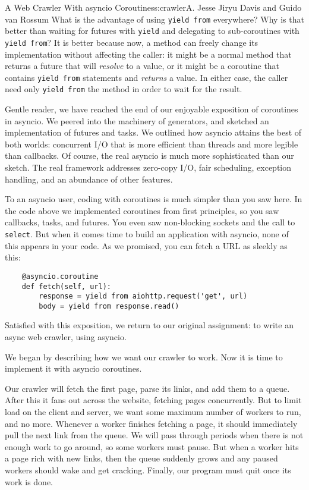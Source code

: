 \begin{aosachapter}{A Web Crawler With asyncio Coroutines}{s:crawler}{A. Jesse Jiryu Davis and Guido van Rossum}
What is the advantage of using \texttt{yield from} everywhere? Why is
that better than waiting for futures with \texttt{yield} and delegating
to sub-coroutines with \texttt{yield from}? It is better because now, a
method can freely change its implementation without affecting the
caller: it might be a normal method that returns a future that will
\emph{resolve} to a value, or it might be a coroutine that contains
\texttt{yield from} statements and \emph{returns} a value. In either
case, the caller need only \texttt{yield from} the method in order to
wait for the result.

Gentle reader, we have reached the end of our enjoyable exposition of
coroutines in asyncio. We peered into the machinery of generators, and
sketched an implementation of futures and tasks. We outlined how asyncio
attains the best of both worlds: concurrent I/O that is more efficient
than threads and more legible than callbacks. Of course, the real
asyncio is much more sophisticated than our sketch. The real framework
addresses zero-copy I/O, fair scheduling, exception handling, and an
abundance of other features.

To an asyncio user, coding with coroutines is much simpler than you saw
here. In the code above we implemented coroutines from first principles,
so you saw callbacks, tasks, and futures. You even saw non-blocking
sockets and the call to \texttt{select}. But when it comes time to build
an application with asyncio, none of this appears in your code. As we
promised, you can fetch a URL as sleekly as this:

\begin{verbatim}
    @asyncio.coroutine
    def fetch(self, url):
        response = yield from aiohttp.request('get', url)
        body = yield from response.read()
\end{verbatim}

Satisfied with this exposition, we return to our original assignment: to
write an async web crawler, using asyncio.

\label{coordinating-coroutines}

We began by describing how we want our crawler to work. Now it is time
to implement it with asyncio coroutines.

Our crawler will fetch the first page, parse its links, and add them to
a queue. After this it fans out across the website, fetching pages
concurrently. But to limit load on the client and server, we want some
maximum number of workers to run, and no more. Whenever a worker
finishes fetching a page, it should immediately pull the next link from
the queue. We will pass through periods when there is not enough work to
go around, so some workers must pause. But when a worker hits a page
rich with new links, then the queue suddenly grows and any paused
workers should wake and get cracking. Finally, our program must quit
once its work is done.


\end{aosachapter}

